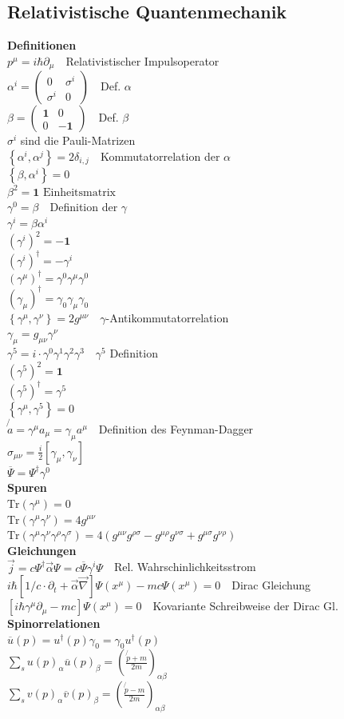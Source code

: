 \documentclass[8pt,a4paper]{extarticle}
\newcommand{\frml}[2]{$#1$~\hfill~#2\\}
\begin{document}
\begin{multicols}{3}
\subsection{Relativistische Quantenmechanik}
\textbf{Definitionen}\\
\frml{p^\mu = i\hbar \partial_\mu}{Relativistischer Impulsoperator}
\frml{\alpha^i = \begin{pmatrix} 0 & \sigma^i \\ \sigma^i & 0 \end{pmatrix}}{Def. $\alpha$}
\frml{\beta = \begin{pmatrix} \mathbf{1} & 0 \\ 0 & -\mathbf{1} \end{pmatrix}}{Def. $\beta$}
$\sigma^i$ sind die Pauli-Matrizen \\
\frml{\left\{\alpha^i,\alpha^j\right\} = 2\delta_{i,j}}{Kommutatorrelation der $\alpha$}
\frml{\left\{\beta, \alpha^i\right\} = 0}{}
\frml{\beta^2 = \mathbf{1} \text{  Einheitsmatrix}}{}
\frml{\gamma^0 = \beta}{Definition der $\gamma$}
\frml{\gamma^i = \beta\alpha^i}{}
\frml{(\gamma^i)^2 = -\mathbf{1}}{}
\frml{(\gamma^i)^\dagger = -\gamma^i}{}
\frml{(\gamma^\mu)^\dagger = \gamma^0\gamma^\mu\gamma^0}{}
\frml{(\gamma_\mu)^\dagger = \gamma_0\gamma_\mu\gamma_0}{}
\frml{\left\{\gamma^\mu,\gamma^\nu \right\} = 2g^{\mu\nu}}{$\gamma$-Antikommutatorrelation}
\frml{\gamma_\mu = g_{\mu\nu}\gamma^\nu}{}
\frml{\gamma^5 = i\cdot \gamma^0\gamma^1\gamma^2\gamma^3}{$\gamma^5$ Definition}
\frml{(\gamma^5)^2 = \mathbf{1}}{}
\frml{(\gamma^5)^\dagger = \gamma^5}{}
\frml{\left\{\gamma^\mu, \gamma^5\right\} = 0}{}
\frml{\not{a} = \gamma^\mu a_\mu = \gamma_\mu a^\mu}{Definition des Feynman-Dagger}
\frml{\sigma_{\mu\nu} = \frac{i}{2}\left[\gamma_\mu, \gamma_\nu\right]}{}
\frml{\overline{\Psi} = \Psi^\dagger \gamma^0}{}
\textbf{Spuren}\\
\frml{\mathrm{Tr}\left( \gamma^\mu\right) = 0}{}
\frml{\mathrm{Tr}\left( \gamma^\mu\gamma^\nu\right) = 4g^{\mu\nu}}{}
\frml{\mathrm{Tr}\left(\gamma^\mu\gamma^\nu\gamma^\rho\gamma^\sigma\right) = 4\left(g^{\mu\nu}g^{\rho\sigma}-g^{\mu\rho}g^{\nu\sigma}+g^{\mu\sigma}g^{\nu\rho}\right)}{}
\textbf{Gleichungen}\\
\frml{\vec{j} = c \Psi^\dagger \vec{\alpha} \Psi = c \overline{\Psi} \gamma^i \Psi}{Rel. Wahrschinlichkeitsstrom}
\frml{i\hbar\left[ 1/c \cdot \partial_t + \vec{\alpha}\vec{\nabla}\right] \Psi(x^\mu) - mc\Psi(x^\mu) = 0}{Dirac Gleichung}
\frml{\left[i\hbar \gamma^\mu \partial_\mu -mc\right]\Psi(x^\mu)=0}{Kovariante Schreibweise der Dirac Gl.}
\textbf{Spinorrelationen}\\
\frml{\overline{u}(p) = u^\dagger(p)\gamma_0 = \gamma_0u^\dagger(p)}{}
\frml{\sum_s u(p)_\alpha \overline{u}(p)_\beta = \left(\frac{\not{p}+m}{2m}\right)_{\alpha\beta}}{}
\frml{\sum_s v(p)_\alpha \overline{v}(p)_\beta = \left(\frac{\not{p}-m}{2m}\right)_{\alpha\beta}}{}

\end{multicols}
\end{document}
